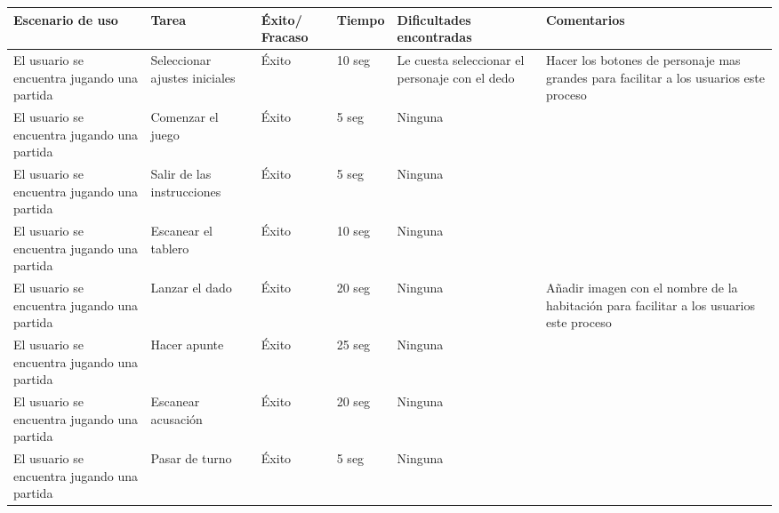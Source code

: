 \begin{table}
  \begin{center}
    \begin{tabular}{|p{2.5cm}|p{1.75cm}|p{1.25cm}|p{1.25cm}|p{2.75cm}|p{3.5cm}|}

      \hline
        \rowcolor{Gray} \textbf{Escenario de uso}
        & \textbf{Tarea}
        & \textbf{Éxito/ Fracaso}
        & \textbf{Tiempo}
        & \textbf{Dificultades encontradas}
        & \textbf{Comentarios}\\

      \hline
      El usuario se encuentra jugando una partida
      & Seleccionar ajustes iniciales
      & Éxito
      & 10 seg
      & Le cuesta seleccionar el personaje con el dedo
      & Hacer los botones de personaje mas grandes para facilitar a los usuarios este proceso\\

      \hline
      El usuario se encuentra jugando una partida
      & Comenzar el juego
      & Éxito
      & 5 seg
      & Ninguna
      &\\

      \hline
      El usuario se encuentra jugando una partida
      & Salir de las instrucciones
      & Éxito
      & 5 seg
      & Ninguna
      &\\

      \hline
      El usuario se encuentra jugando una partida
      & Escanear el tablero
      & Éxito
      & 10 seg
      & Ninguna
      &\\

      \hline
      El usuario se encuentra jugando una partida
      & Lanzar el dado
      & Éxito
      & 20 seg
      & Ninguna
      & Añadir imagen con el nombre de la habitación para facilitar a los usuarios este proceso\\

      \hline
      El usuario se encuentra jugando una partida
      & Hacer apunte
      & Éxito
      & 25 seg
      & Ninguna
      &\\

      \hline
      El usuario se encuentra jugando una partida
      & Escanear acusación
      & Éxito
      & 20 seg
      & Ninguna
      &\\

      \hline
      El usuario se encuentra jugando una partida
      & Pasar de turno
      & Éxito
      & 5 seg
      & Ninguna
      &\\


\end{tabular}
\end{center}
\end{table}
